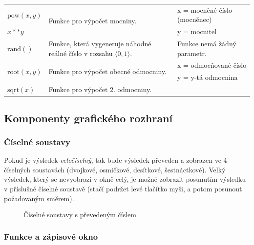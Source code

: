 \documentclass[a4paper, 11pt]{article}
\begin{document}
\begin{table}[H]
\begin{tabular}{|p{3cm}|p{6.25cm}|p{6.25cm}|}
        $\text{pow}(x,y)$   & \multirow{2}{*}{Funkce pro výpočet mocniny.}  & x = mocněné číslo (mocněnec) \\ \cline{1-1}
        $x**y$  &   & y = mocnitel \\ \cline{1-3}
        $\text{rand}()$  & Funkce, která vygeneruje náhodné reálné číslo v rozsahu $\langle 0, 1 \rangle$. & Funkce nemá žádný parametr. \\ \cline{1-3}
        \multirow{2}{*}{$\text{root}(x, y)$} & \multirow{2}{*}{Funkce pro výpočet obecné odmocniny.}  & x = odmocňované číslo \\
            &   & y = y-tá odmocnina \\ \cline{1-3}
        $\text{sqrt}(x)$    & Funkce pro výpočet 2. odmocniny. & \\ \cline{1-3}
                                    
    \end{tabular}
\end{table}

\subsection{Komponenty grafického rozhraní}

\subsubsection{Číselné soustavy}

Pokud je výsledek \emph{celočíselný}, tak bude výsledek převeden a
zobrazen ve 4 číselných soustavách (dvojkové, osmičkové, desítkové,
šestnáctkové). Velký výsledek, který se nevyobrazí v okně celý, je možné
zobrazit posunutím výsledku v příslušné číselné soustavě (stačí podržet levé tlačítko myši, a potom posunout požadovaným směrem).

\begin{figure}[H]
    \centering
    \caption{Číselné soustavy s převedeným číslem}
\end{figure}

\subsubsection{Funkce a zápisové okno}
\end{document}
